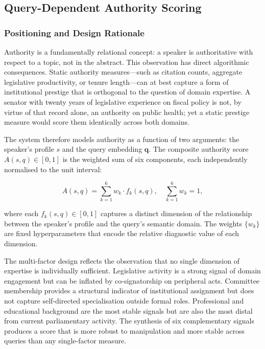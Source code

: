\subsection{Query-Dependent Authority Scoring}
\label{sec:authority-scoring}

\subsubsection{Positioning and Design Rationale}

Authority is a fundamentally relational concept: a speaker is authoritative with respect to
a topic, not in the abstract. This observation has direct algorithmic consequences. Static
authority measures---such as citation counts, aggregate legislative productivity, or tenure
length---can at best capture a form of institutional prestige that is orthogonal to the
question of domain expertise. A senator with twenty years of legislative experience on fiscal
policy is not, by virtue of that record alone, an authority on public health; yet a static
prestige measure would score them identically across both domains.

The system therefore models authority as a function of two arguments: the speaker's profile
$s$ and the query embedding $\mathbf{q}$. The composite authority score
$A(s, q) \in [0, 1]$ is the weighted sum of six components, each independently normalised to
the unit interval:

\begin{equation}
    A(s, q) = \sum_{k=1}^{6} w_k \cdot f_k(s, q), \quad \sum_{k=1}^{6} w_k = 1,
    \label{eq:authority}
\end{equation}

where each $f_k(s, q) \in [0, 1]$ captures a distinct dimension of the relationship between
the speaker's profile and the query's semantic domain. The weights $\{w_k\}$ are fixed
hyperparameters that encode the relative diagnostic value of each dimension.

The multi-factor design reflects the observation that no single dimension of expertise is
individually sufficient. Legislative activity is a strong signal of domain engagement but can
be inflated by co-signatorship on peripheral acts. Committee membership provides a structural
indicator of institutional assignment but does not capture self-directed specialisation outside
formal roles. Professional and educational background are the most stable signals but are also
the most distal from current parliamentary activity. The synthesis of six complementary signals
produces a score that is more robust to manipulation and more stable across queries than any
single-factor measure.

